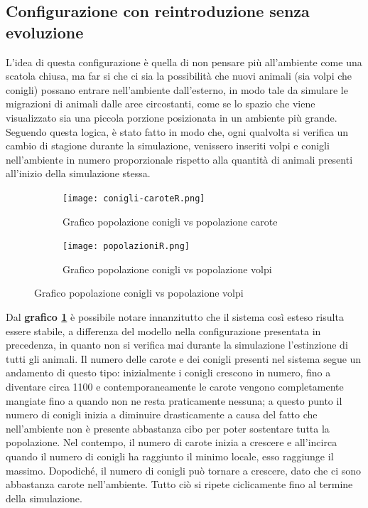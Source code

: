 \documentclass[11pt]{article}
\begin{document}
\subsection{Configurazione con reintroduzione senza evoluzione}
\label{sec:reintroduzioneNoEvoluzione}
L'idea di questa configurazione è quella di non pensare più all'ambiente come una scatola chiusa, ma far si che ci sia la possibilità che nuovi animali (sia volpi che conigli) possano entrare nell'ambiente dall'esterno, in modo tale da simulare le migrazioni di animali dalle aree circostanti, come se lo spazio che viene visualizzato sia una piccola porzione posizionata in un ambiente più grande. 
Seguendo questa logica, è stato fatto in modo che, ogni qualvolta si verifica un cambio di stagione durante la simulazione, venissero inseriti volpi e conigli nell'ambiente in numero proporzionale rispetto alla quantità di animali presenti all'inizio della simulazione stessa.


\begin{figure}[h!]
	\hspace{-5mm}
	\begin{subfigure}{\textwidth}
            \centering
     \texttt{[image: conigli-caroteR.png]}
     \caption{Grafico popolazione conigli vs popolazione carote}
     \label{fig:conigliCaroteReintroduzione}
	\end{subfigure}
	\begin{subfigure}{\textwidth}
		\centering
     \texttt{[image: popolazioniR.png]}
     \caption{Grafico popolazione conigli vs popolazione volpi}
     \label{fig:conigliVolpiReintroduzione}
	\end{subfigure}
\end{figure}

\newpage

Dal \textbf{grafico \ref{fig:conigliCaroteReintroduzione}} è possibile notare innanzitutto che il sistema così esteso risulta essere stabile, a differenza del modello nella configurazione presentata in precedenza, in quanto non si verifica mai durante la simulazione l'estinzione di tutti gli animali. 
Il numero delle carote e dei conigli presenti nel sistema segue un andamento di questo tipo: inizialmente i conigli crescono in numero, fino a diventare circa 1100 e contemporaneamente le carote vengono completamente mangiate fino a quando non ne resta praticamente nessuna; a questo punto il numero di conigli inizia a diminuire drasticamente a causa del fatto che nell'ambiente non è presente abbastanza cibo per poter sostentare tutta la popolazione. Nel contempo, il numero di carote inizia a crescere e all'incirca quando il numero di conigli ha raggiunto il minimo locale, esso raggiunge il massimo. Dopodiché, il numero di conigli può tornare a crescere, dato che ci sono abbastanza carote nell'ambiente. Tutto ciò si ripete ciclicamente fino al termine della simulazione. 
\end{document}
